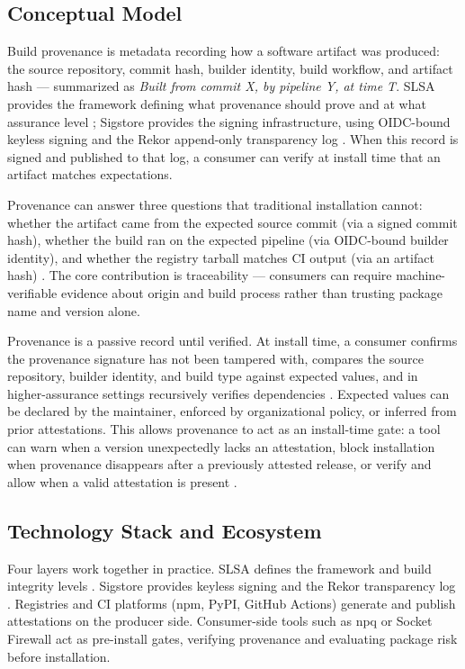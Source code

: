 \documentclass[12pt,a4paper]{article}
\begin{document}
\subsection{Conceptual Model}

Build provenance is metadata recording how a software artifact was produced: the source repository, commit hash, builder identity, build workflow, and artifact hash --- summarized as \textit{Built from commit X, by pipeline Y, at time T}. SLSA provides the framework defining what provenance should prove and at what assurance level \cite{slsa-about}; Sigstore provides the signing infrastructure, using OIDC-bound keyless signing and the Rekor append-only transparency log \cite{sigstore}. When this record is signed and published to that log, a consumer can verify at install time that an artifact matches expectations.

Provenance can answer three questions that traditional installation cannot: whether the artifact came from the expected source commit (via a signed commit hash), whether the build ran on the expected pipeline (via OIDC-bound builder identity), and whether the registry tarball matches CI output (via an artifact hash) \cite{slsa-about}. The core contribution is traceability --- consumers can require machine-verifiable evidence about origin and build process rather than trusting package name and version alone.

Provenance is a passive record until verified. At install time, a consumer confirms the provenance signature has not been tampered with, compares the source repository, builder identity, and build type against expected values, and in higher-assurance settings recursively verifies dependencies \cite{slsa-verify}. Expected values can be declared by the maintainer, enforced by organizational policy, or inferred from prior attestations. This allows provenance to act as an install-time gate: a tool can warn when a version unexpectedly lacks an attestation, block installation when provenance disappears after a previously attested release, or verify and allow when a valid attestation is present \cite{npq}.

\subsection{Technology Stack and Ecosystem}

Four layers work together in practice. SLSA defines the framework and build integrity levels \cite{slsa-about}. Sigstore provides keyless signing and the Rekor transparency log \cite{sigstore}. Registries and CI platforms (npm, PyPI, GitHub Actions) generate and publish attestations on the producer side. Consumer-side tools such as npq \cite{npq} or Socket Firewall \cite{socket-firewall} act as pre-install gates, verifying provenance and evaluating package risk before installation.
\end{document}
